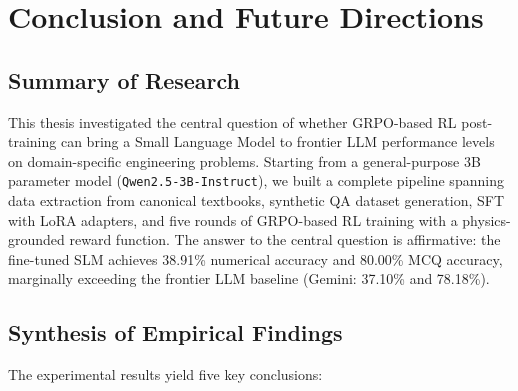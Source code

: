 \documentclass[12pt]{report}
\begin{document}
\chapter{Conclusion and Future Directions}

\section{Summary of Research}

This thesis investigated the central question of whether GRPO-based RL post-training can bring a Small Language Model to frontier LLM performance levels on domain-specific engineering problems. Starting from a general-purpose 3B parameter model (\texttt{Qwen2.5-3B-Instruct}), we built a complete pipeline spanning data extraction from canonical textbooks, synthetic QA dataset generation, SFT with LoRA adapters, and five rounds of GRPO-based RL training with a physics-grounded reward function. The answer to the central question is affirmative: the fine-tuned SLM achieves 38.91\% numerical accuracy and 80.00\% MCQ accuracy, marginally exceeding the frontier LLM baseline (Gemini: 37.10\% and 78.18\%).

\section{Synthesis of Empirical Findings}

The experimental results yield five key conclusions:
\end{document}
